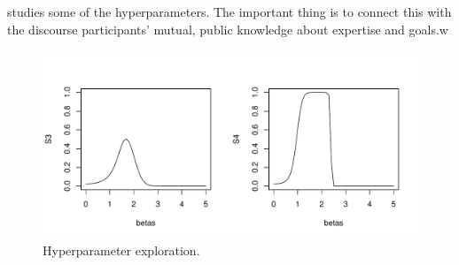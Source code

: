  studies some of the hyperparameters. The
important thing is to connect this with the discourse participants'
mutual, public knowledge about expertise and goals.w


\begin{figure}[htp]
  \centering
  \includegraphics[width=1\textwidth]{images/S3andS4}
  \caption{Hyperparameter exploration.}
  \label{fig:S3andS4}
\end{figure}


